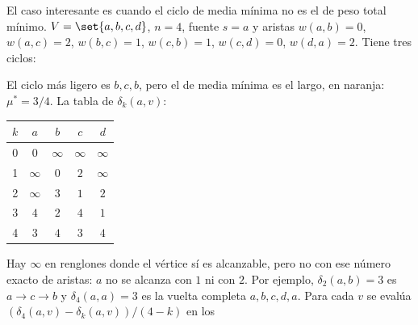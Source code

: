 \documentclass[11pt,letterpaper]{article}
\begin{document}
\begin{ejemplo}
  \label{ej:caminos-karp}
  El caso interesante es cuando el ciclo de media mínima no es el de
  peso total mínimo. $V = \set{a, b, c, d}$, $n = 4$, fuente $s = a$
  y aristas $w(a, b) = 0$, $w(a, c) = 2$, $w(b, c) = 1$,
  $w(c, b) = 1$, $w(c, d) = 0$, $w(d, a) = 2$. Tiene tres ciclos:
  \begin{center}
  \end{center}
  El ciclo más ligero es $b, c, b$, pero el de media mínima es el
  largo, en naranja: $\mu^* = 3/4$. La tabla de $\delta_k(a, v)$:
  \begin{center}
  \small
  \begin{tabular}{ccccc}
    \toprule
    $k$ & $a$ & $b$ & $c$ & $d$ \\
    \midrule
    0 & $0$ & $\infty$ & $\infty$ & $\infty$ \\
    1 & $\infty$ & $0$ & $2$ & $\infty$ \\
    2 & $\infty$ & $3$ & $1$ & $2$ \\
    3 & $4$ & $2$ & $4$ & $1$ \\
    4 & $3$ & $4$ & $3$ & $4$ \\
    \bottomrule
  \end{tabular}
  \end{center}
  Hay $\infty$ en renglones donde el vértice sí es alcanzable, pero no
  con ese número exacto de aristas: $a$ no se alcanza con $1$ ni con
  $2$. Por ejemplo, $\delta_2(a, b) = 3$ es $a \to c \to b$ y
  $\delta_4(a, a) = 3$ es la vuelta completa $a, b, c, d, a$. Para cada
  $v$ se evalúa $(\delta_4(a, v) - \delta_k(a, v)) / (4 - k)$ en los

\end{ejemplo}
\end{document}
